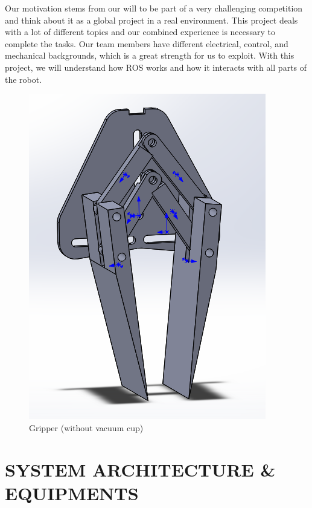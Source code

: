 \documentclass[letterpaper, 10 pt, conference]{ieeeconf}  %
\begin{document}
Our motivation stems from our will to be part of a very challenging competition and think about it as a global project in a real environment. This project deals with a lot of different topics and our combined experience is necessary to complete the tasks. Our team members have different electrical, control, and mechanical backgrounds, which is a great strength for us to exploit. With this project, we will understand how ROS works and how it interacts with all parts of the robot.

\begin{figure}[t]
\includegraphics[width=0.95\columnwidth]{gripper}
\centering
\caption{Gripper (without vacuum cup)}
\label{figure:gripper}
\end{figure}

\section{SYSTEM ARCHITECTURE \& EQUIPMENTS}
\end{document}
